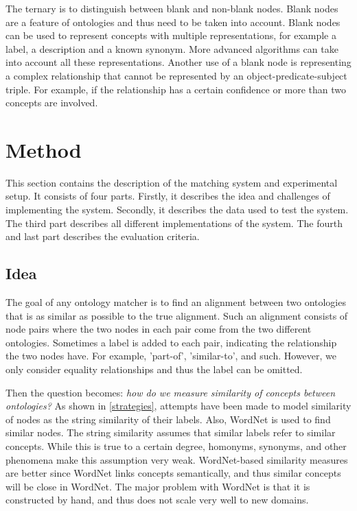 \documentclass{article}
\begin{document}
 The ternary is to distinguish between blank and non-blank nodes. Blank nodes are a feature of ontologies and thus need to be taken into account. Blank nodes can be used to represent concepts with multiple representations, for example a label, a description and a known synonym. More advanced algorithms can take into account all these representations. Another use of a blank node is representing a complex relationship that cannot be represented by an object-predicate-subject triple. For example, if the relationship has a certain confidence or more than two concepts are involved.
 
 \newpage
 \section{Method} 
 This section contains the description of the matching system and experimental setup. It consists of four parts. Firstly, it describes the idea and challenges of implementing the system. Secondly, it describes the data used to test the system. The third part describes all different implementations of the system. The fourth and last part describes the evaluation criteria.
 
 \subsection{Idea}
The goal of any ontology matcher is to find an alignment between two ontologies that is as similar as possible to the true alignment. Such an alignment consists of node pairs where the two nodes in each pair come from the two different ontologies. Sometimes a label is added to each pair, indicating the relationship the two nodes have. For example, 'part-of', 'similar-to', and such. However, we only consider equality relationships and thus the label can be omitted.
 
 Then the question becomes: \textit{how do we measure similarity of concepts between ontologies?} As shown in \ref{strategies}, attempts have been made to model similarity of nodes as the string similarity of their labels. Also, WordNet is used to find similar nodes. The string similarity assumes that similar labels refer to similar concepts. While this is true to a certain degree, homonyms, synonyms, and other phenomena make this assumption very weak. WordNet-based similarity measures are better since WordNet links concepts semantically, and thus similar concepts will be close in WordNet. The major problem with WordNet is that it is constructed by hand, and thus does not scale very well to new domains.
 
\end{document}
